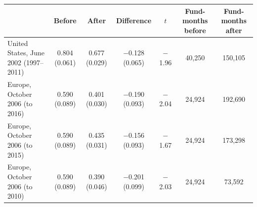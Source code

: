 \begin{tabular}{lcccccc}
\toprule
 & Before & After & Difference & $t$ & Fund-months before & Fund-months after \\
\midrule
United States, June 2002 (1997--2011) & 0.804 (0.061) & 0.677 (0.029) & $-$0.128 (0.065) & $-$1.96 & 40,250 & 150,105 \\
Europe, October 2006 (to 2016) & 0.590 (0.089) & 0.401 (0.030) & $-$0.190 (0.093) & $-$2.04 & 24,924 & 192,690 \\
Europe, October 2006 (to 2015) & 0.590 (0.089) & 0.435 (0.031) & $-$0.156 (0.093) & $-$1.67 & 24,924 & 173,298 \\
Europe, October 2006 (to 2010) & 0.590 (0.089) & 0.390 (0.046) & $-$0.201 (0.099) & $-$2.03 & 24,924 & 73,592 \\
\bottomrule
\end{tabular}
